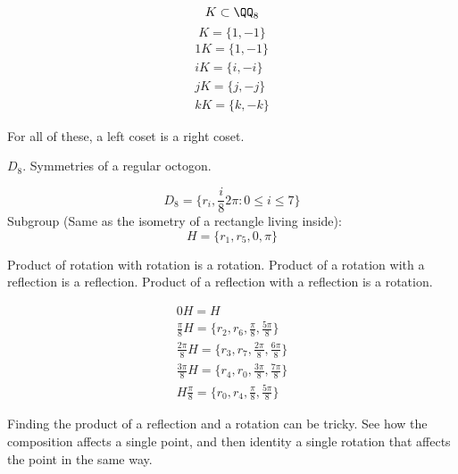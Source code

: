 \documentclass[11pt]{scrartcl}
\begin{document}
\begin{example}
  $$K \subset \QQ_8$$
  $$K = \{1, -1\}$$
  \begin{gather*}
    1K = \{1, -1\} \\
    iK = \{i, -i\} \\
    jK = \{j, -j\} \\
    kK = \{k, -k\}
  \end{gather*}
  \begin{note}
    For all of these, a left coset is a right coset.
  \end{note}
\end{example}

\begin{example}
  $D_8$. Symmetries of a regular octogon. 

  $$D_8 = \{r_i, \frac{i}{8}2\pi: 0 \leq i \leq 7\}$$
  Subgroup (Same as the isometry of a rectangle living inside): $$H = \{r_1, r_5, 0, \pi\}$$

  \begin{note}
    Product of rotation with rotation is a rotation. Product of a rotation with a reflection is a reflection. Product of a reflection with a reflection is a rotation.
  \end{note}

  \begin{gather*}
    0H = H \\
    \frac{\pi}{8}H = \{r_2, r_6, \frac{\pi}{8}, \frac{5\pi}{8}\} \\
    \frac{2\pi}{8}H = \{r_3, r_7, \frac{2\pi}{8}, \frac{6\pi}{8}\} \\
    \frac{3\pi}{8}H = \{r_4, r_0, \frac{3\pi}{8}, \frac{7\pi}{8}\} \\
    H\frac{\pi}{8} = \{r_0, r_4, \frac{\pi}{8}, \frac{5\pi}{8}\} 
  \end{gather*}
  \begin{note}
    Finding the product of a reflection and a rotation can be tricky. See how the composition affects a single point, and then identity a single rotation that affects the point in the same way.
  \end{note}
\end{example}
\end{document}
